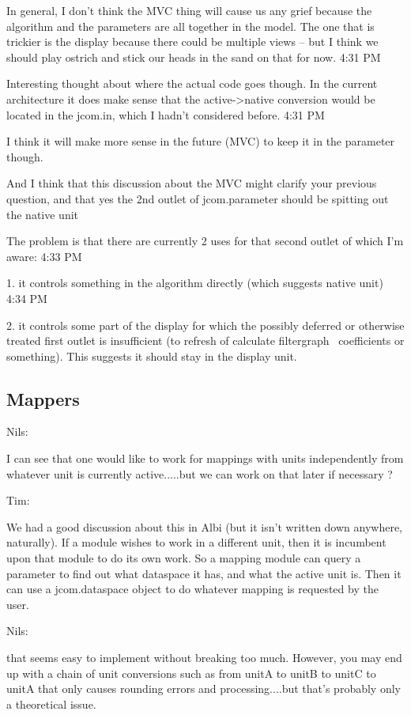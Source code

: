 \documentclass[]{article}
\begin{document}
In general, I don't think the MVC thing will cause us any grief because the algorithm and the parameters are all together in the model.  The one that is trickier is the display because there could be multiple views -- but I think we should play ostrich and stick our heads in the sand on that for now.
4:31 PM
 
Interesting thought about where the actual code goes though.  In the current architecture it does make sense that the active->native conversion would be located in the jcom.in, which I hadn't considered before.
4:31 PM
 
I think it will make more sense in the future (MVC) to keep it in the parameter though.

And I think that this discussion about the MVC might clarify your previous question, and that yes the 2nd outlet of jcom.parameter should be spitting out the native unit

The problem is that there are currently 2 uses for that second outlet of which I'm aware:
4:33 PM
 
1. it controls something in the algorithm directly (which suggests native unit)
4:34 PM
 
2. it controls some part of the display for which the possibly deferred or otherwise treated first outlet is insufficient (to refresh of calculate filtergraph~ coefficients or something).  This suggests it should stay in the display unit.


\subsection{Mappers}

Nils:

I can see that one would like to work for mappings with units independently from whatever unit is currently active.....but we can work on that later if necessary ?

Tim:

We had a good discussion about this in Albi (but it isn't written down anywhere, naturally).  If a module wishes to work in a different unit, then it is incumbent upon that module to do its own work.  So a mapping module can query a parameter to find out what dataspace it has, and what the active unit is.  Then it can use a jcom.dataspace object to do whatever mapping is requested by the user.

Nils:

that seems easy to implement without breaking too much. However, you may end up with a chain of unit conversions such as from unitA to unitB to unitC to unitA that only causes rounding errors and processing....but that's probably only a theoretical issue.
\end{document}
